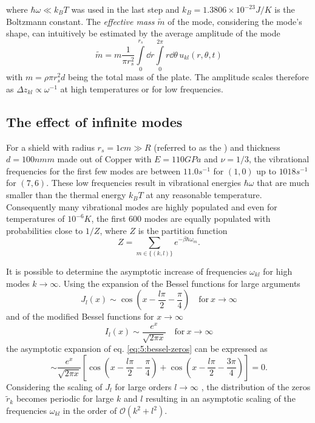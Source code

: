 where $\hbar\omega \ll k_B T$ was used in the last step and $k_B = 1.3806\times 10^{-23} \si{J/K}$ is the Boltzmann constant.
The \textit{effective mass} $\tilde{m}$ of the mode, considering the mode's shape, can intuitively be estimated by the average amplitude of the mode 
\begin{equation}\label{eq:5:effective-mass}
  \tilde{m} = m\frac{1}{\pi r_s^2}\int\limits_0^{r_s} \dd r \int\limits_0^{2\pi} r\dd\theta \, u_{kl}(r, \theta, t)
\end{equation}
with $m=\rho \pi r_s^2 d$ being the total mass of the plate.
The amplitude scales therefore as $\Delta z_{kl} \propto \omega^{-1}$ at high temperatures or for low frequencies.




\subsection*{The effect of infinite modes}
For a shield with radius $r_s = 1\si{cm} \gg R$ (referred to as the ) and thickness $d=100\si{nmm}$ made out of Copper with $E = 110\si{GPa}$ and $\nu = 1/3$, the vibrational frequencies for the first few modes are between $11.0\si{s^{-1}}$ for $(1,0)$ up to $1018\si{s^{-1}}$ for $(7,6)$.
These low frequencies result in vibrational energies $\hbar \omega$ that are much smaller than the thermal energy $k_B T$ at any reasonable temperature.
Consequently many vibrational modes are highly populated and even for temperatures of $10^{-6}\si{K}$, the first 600 modes are equally populated with probabilities close to $1/Z$, where $Z$ is the partition function
\begin{equation}
  Z = \sum_{m\in\{(k,l)\}} e^{-\beta \hbar \omega_m} .
\end{equation}

It is possible to determine the asymptotic increase of frequencies $\omega_{kl}$ for high modes $k \rightarrow \infty$.
Using the expansion of the Bessel functions for large arguments \cite[eq. 10.17.3]{DLMF}
\begin{equation}
  J_l(x) \sim \cos(x - \frac{l \pi}{2} - \frac{\pi}{4}) \quad \text{for} \ x \rightarrow \infty
\end{equation}
and of the modified Bessel functions for $x\rightarrow\infty$ \cite[eq. 10.40.1]{DLMF}
\begin{equation}
  I_l(x) \sim \frac{e^x}{\sqrt{2\pi x}} \quad \text{for} \ x \rightarrow \infty
\end{equation}
the asymptotic expansion of eq. \eqref{eq:5:bessel-zeros} can be expressed as
\begin{equation}
  \sim \frac{e^x}{\sqrt{2\pi x}} \left[\cos(x - \frac{l \pi}{2} - \frac{\pi}{4}) + \cos(x - \frac{l \pi}{2} - \frac{3 \pi}{4})\right] = 0 .
\end{equation}
Considering the scaling of $J_l$ for large orders $l\rightarrow \infty$ \cite[eq. 10.19.1]{DLMF}, the distribution of the zeros $\tilde{r}_k$ becomes periodic for large $k$ and $l$ resulting in an asymptotic scaling of the frequencies $\omega_{kl}$ in the order of $\mathcal{O}(k^2 + l^2)$.

